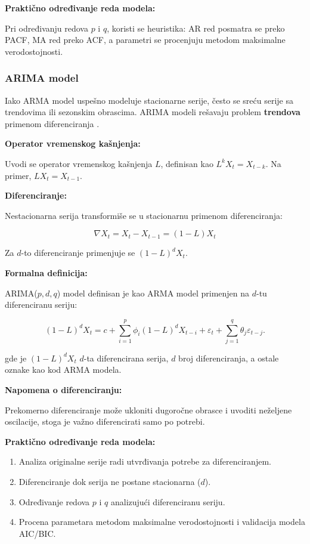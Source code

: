 \documentclass[12pt]{article}
\begin{document}
\textbf{Praktično određivanje reda modela:}

Pri određivanju redova $p$ i $q$, koristi se heuristika: AR red posmatra se preko PACF, MA red preko ACF, a parametri se procenjuju metodom maksimalne verodostojnosti.

\subsubsection{ARIMA model}

Iako ARMA model uspešno modeluje stacionarne serije, često se sreću serije sa trendovima ili sezonskim obrascima. ARIMA modeli rešavaju problem \textbf{trendova} primenom diferenciranja \cite{box1970, hamilton1994}.

\textbf{Operator vremenskog kašnjenja:}

Uvodi se operator vremenskog kašnjenja $L$, definisan kao $L^k X_t = X_{t-k}$. Na primer, $L X_t = X_{t-1}$.

\textbf{Diferenciranje:}

Nestacionarna serija transformiše se u stacionarnu primenom diferenciranja:

\begin{equation}
\nabla X_t = X_t - X_{t-1} = (1 - L) X_t
\end{equation}

Za $d$-to diferenciranje primenjuje se $(1 - L)^d X_t$.

\textbf{Formalna definicija:}

ARIMA($p,d,q$) model definisan je kao ARMA model primenjen na $d$-tu diferenciranu seriju:

\begin{equation}
(1 - L)^d X_t = c + \sum_{i=1}^{p} \phi_i (1 - L)^d X_{t-i}
           + \varepsilon_t
           + \sum_{j=1}^{q} \theta_j \varepsilon_{t-j}.
\end{equation}

gde je $(1 - L)^d X_t$ $d$-ta diferencirana serija, $d$ broj diferenciranja, a ostale oznake kao kod ARMA modela.

\textbf{Napomena o diferenciranju:}

Prekomerno diferenciranje može ukloniti dugoročne obrasce i uvoditi neželjene oscilacije, stoga je važno diferencirati samo po potrebi.

\textbf{Praktično određivanje reda modela:}

\begin{enumerate}
    \item Analiza originalne serije radi utvrđivanja potrebe za diferenciranjem.
    \item Diferenciranje dok serija ne postane stacionarna ($d$).
    \item Određivanje redova $p$ i $q$ analizujući diferenciranu seriju.
    \item Procena parametara metodom maksimalne verodostojnosti i validacija modela AIC/BIC.
\end{enumerate}
\end{document}

